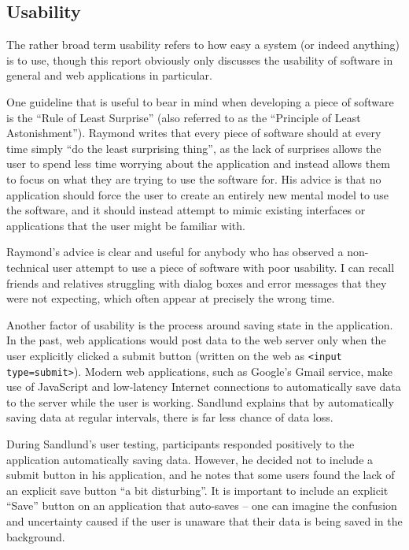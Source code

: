 
\subsection{Usability}

The rather broad term usability refers to how easy a system (or indeed
anything) is to use, though this report obviously only discusses the usability
of software in general and web applications in particular.


One guideline that is useful to bear in mind when developing a piece of
software is the ``Rule of Least Surprise'' \cite{RaymondAUP_2003} (also
referred to as the ``Principle of Least Astonishment''). Raymond writes that
every piece of software should at every time simply ``do the least surprising
thing'', as the lack of surprises allows the user to spend less time worrying
about the application and instead allows them to focus on what they are trying
to use the software for. His advice is that no application should force the
user to create an entirely new mental model to use the software, and it should
instead attempt to mimic existing interfaces or applications that the user
might be familiar with.

Raymond's advice is clear and useful for anybody who has observed a
non-technical user attempt to use a piece of software with poor usability. I
can recall friends and relatives struggling with dialog boxes and error
messages that they were not expecting, which often appear at precisely the
wrong time.

Another factor of usability is the process around saving state in the
application. In the past, web applications would \gls{post} data to the web
server only when the user explicitly clicked a submit button (written on the
web as \texttt{<input type=submit>}). Modern web applications, such as
Google's Gmail service, make use of JavaScript and low-latency Internet
connections to automatically save data to the server while the user is
working. Sandlund \cite{sandlund2009websoftware} explains that by
automatically saving data at regular intervals, there is far less chance of
data loss.

During Sandlund's user testing, participants responded positively to the
application automatically saving data. However, he decided not to include a
submit button in his application, and he notes that some users found the lack
of an explicit save button ``a bit disturbing''. It is important to include an
explicit ``Save'' button on an application that auto-saves -- one can imagine
the confusion and uncertainty caused if the user is unaware that their data is
being saved in the background.

